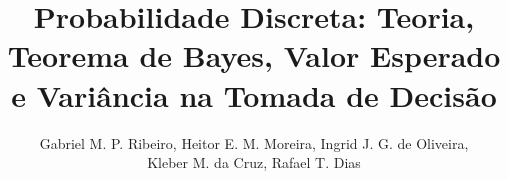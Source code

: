 \documentclass[12pt]{article}
\title{Probabilidade Discreta: Teoria, Teorema de Bayes, Valor Esperado e Variância na Tomada de Decisão}
\author{
    Gabriel M. P. Ribeiro\inst{*},
    Heitor E. M. Moreira\inst{**},
    Ingrid J. G. de Oliveira\inst{***},\\
    Kleber M. da Cruz\inst{****},
    Rafael T. Dias\inst{*****}
}
\begin{document}
    \maketitle

    
    
    

    
    
    
    

    
    

    \nocite{*}

    
    
\end{document}
